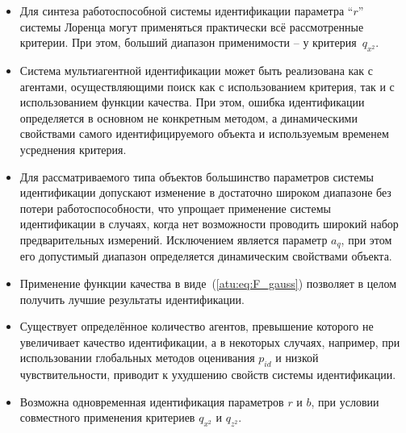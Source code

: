 \begin{itemize}

  \item
    Для синтеза работоспособной системы идентификации параметра  ``$r$''
    системы Лоренца могут применяться практически всё рассмотренные критерии.
    При этом, больший диапазон применимости -- у критерия~$q_{x^2}$.

  \item
    Система мультиагентной идентификации может быть
    реализована как с агентами, осуществляющими поиск
    как с использованием критерия, так и с использованием
    функции качества. При этом, ошибка идентификации
    определяется в основном не конкретным методом,
    а динамическими свойствами самого идентифицируемого
    объекта и используемым временем усреднения критерия.

  \item
    Для рассматриваемого типа объектов большинство параметров
    системы идентификации допускают изменение в достаточно
    широком диапазоне без потери работоспособности,
    что упрощает применение системы идентификации
    в случаях, когда нет возможности проводить
    широкий набор предварительных измерений.
    Исключением является параметр $a_q$, при этом его допустимый диапазон
    определяется динамическим свойствами объекта.

  \item
    Применение функции качества в виде~(\ref{atu:eq:F_gauss})
    позволяет в целом получить лучшие результаты идентификации.

  \item
    Существует определённое количество агентов,
    превышение которого не увеличивает качество идентификации,
    а в некоторых случаях, например, при использовании глобальных
    методов оценивания $p_{id}$ и низкой чувствительности,
    приводит к ухудшению свойств системы идентификации.

  \item
    Возможна одновременная идентификация параметров $r$ и $b$,
    при условии совместного применения критериев $q_{x^2}$ и $q_{z^2}$.

\end{itemize}








